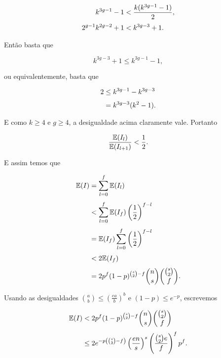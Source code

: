 \begin{equation*}
\setlength{\jot}{6pt}
\begin{aligned}
k^{3g-1}-1 &< \frac{k(k^{3g-1}-1)}{2}, \\
2^{g-1}k^{2g-2}+1 &< k^{3g-3}+1.
\end{aligned}
\end{equation*}

Então basta que

\[k^{3g-3}+1 \leq k^{3g-1}-1,\]

ou equivalentemente, basta que

\begin{equation*}
\setlength{\jot}{6pt}
\begin{aligned}
2 &\leq k^{3g-1} - k^{3g-3} \\
&= k^{3g-3}(k^2 - 1).
\end{aligned}
\end{equation*}

E como $k \geq 4$ e $g \geq 4$, a desigualdade acima claramente vale. Portanto

\[\frac{\mathbb{E}(I_l)}{\mathbb{E}(I_{l+1})} < \frac{1}{2}.\]

E assim temos que

\begin{equation*}
\setlength{\jot}{6pt}
\begin{aligned}
\bbe(I) &= \sum\limits_{l=0}^{f}\bbe(I_l) \\
&< \sum\limits_{l=0}^{f} \bbe(I_f)\left(\frac{1}{2}\right)^{f-l} \\
&= \bbe(I_f)\sum\limits_{l=0}^{f} \left(\frac{1}{2}\right)^{f-l} \\
&< 2\bbe(I_f) \\
&= 2p^f(1-p)^{\binom{s}{2}-f}\binom{n}{s}\binom{\binom{s}{2}}{f}.
\end{aligned}
\end{equation*}

Usando as desigualdades $\binom{a}{b} \leq \left(\frac{ea}{b}\right)^b$ e  $(1-p) \leq e^{-p}$, escrevemos

\begin{equation*}
\setlength{\jot}{6pt}
\begin{aligned}
\bbe(I) &< 2p^f(1-p)^{\binom{s}{2}-f}\binom{n}{s}\binom{\binom{s}{2}}{f} \\
&\leq 2e^{-p\left(\binom{s}{2}-f\right)}\left(\frac{en}{s}\right)^s\left(\frac{\binom{s}{2}e}{f}\right)^f p^f.
\end{aligned}
\end{equation*}

